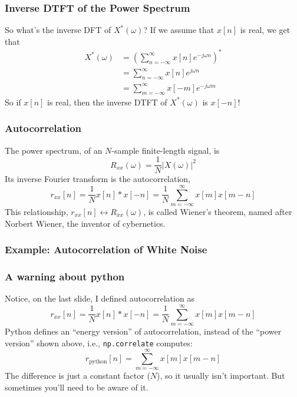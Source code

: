 \documentclass{beamer}
\begin{document}
\begin{frame}
  \frametitle{Inverse DTFT of the Power Spectrum}

  So what's the inverse DFT of $X^*(\omega)$?  If we assume that $x[n]$ is
  real, we get that
  \begin{align*}
    X^*(\omega) &= \left(\sum_{n=-\infty}^{\infty}x[n]e^{-j\omega n}\right)^*\\
    &= \sum_{n=-\infty}^{\infty}x[n]e^{j\omega n}\\
    &= \sum_{m=-\infty}^{\infty}x[-m]e^{-j\omega m}
  \end{align*}
  So if $x[n]$ is real, then the inverse DTFT of $X^*(\omega)$ is $x[-n]$!
\end{frame}
\begin{frame}
  \frametitle{Autocorrelation}
  The power spectrum, of an $N$-sample finite-length signal, is
  \[
  R_{xx}(\omega)=\frac{1}{N}|X(\omega)|^2
  \]
  Its inverse Fourier transform is the autocorrelation,
  \[
  r_{xx}[n] = \frac{1}{N}x[n]\ast x[-n]  = \frac{1}{N}\sum_{m=-\infty}^\infty  x[m] x[m-n]
  \]
  This relationship, $r_{xx}[n]\leftrightarrow R_{xx}(\omega)$, is called
  Wiener's theorem, named after Norbert Wiener, the inventor of
  cybernetics.
\end{frame}

\begin{frame}
  \frametitle{Example: Autocorrelation of White Noise}
  
  \centerline{}
\end{frame}

\begin{frame}
  \frametitle{A warning about python}

  Notice, on the last slide, I defined autocorrelation as
  \[
  r_{xx}[n] = \frac{1}{N}x[n]\ast x[-n]  = \frac{1}{N}\sum_{m=-\infty}^\infty  x[m] x[m-n]
  \]
  Python defines an ``energy version'' of autocorrelation, instead of
  the ``power version'' shown above, i.e., {\tt np.correlate} computes:
  \[
  r_{\mbox{python}}[n] = \sum_{m=-\infty}^\infty x[m]x[m-n]
  \]
  The difference is just a constant factor ($N$), so it usually isn't
  important.  But sometimes you'll need to be aware of it.
\end{frame}
  
\end{document}
